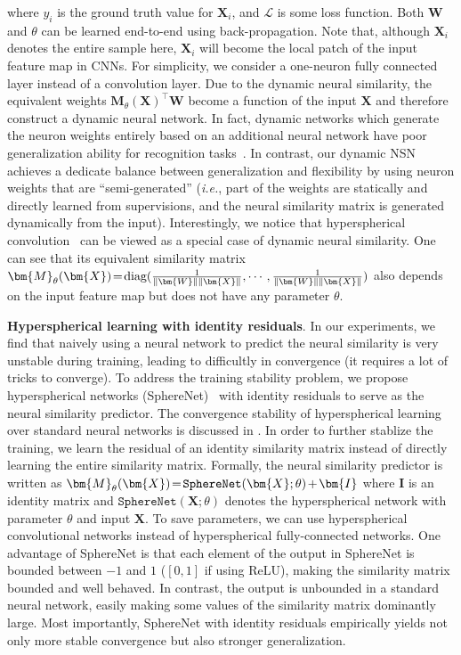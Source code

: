 where $y_i$ is the ground truth value for $\bm{X}_i$, and $\mathcal{L}$ is some loss function. Both $\bm{W}$ and $\theta$ can be learned end-to-end using back-propagation. Note that, although $\bm{X}_i$ denotes the entire sample here, $\bm{X}_i$ will become the local patch of the input feature map in CNNs. For simplicity, we consider a one-neuron fully connected layer instead of a convolution layer.  Due to the dynamic neural similarity, the equivalent weights $\bm{M}_\theta(\bm{X})^\top \bm{W}$ become a function of the input $\bm{X}$ and therefore construct a dynamic neural network. In fact, dynamic networks which generate the neuron weights entirely based on an additional neural network have poor generalization ability for recognition tasks~\cite{ha2016hypernetworks}. In contrast, our dynamic NSN achieves a dedicate balance between generalization and flexibility by using neuron weights that are ``semi-generated'' (\emph{i.e.}, part of the weights are statically and directly learned from supervisions, and the neural similarity matrix is generated dynamically from the input). Interestingly, we notice that hyperspherical convolution~\cite{liu2017hyper} can be viewed as a special case of dynamic neural similarity. One can see that its equivalent similarity matrix $\thickmuskip=2mu \medmuskip=2mu \bm{M}_\theta(\bm{X})=\textnormal{diag}(\frac{1}{\|\bm{W}\|\|\bm{X}\|},\cdots,\frac{1}{\|\bm{W}\|\|\bm{X}\|})$ also depends on the input feature map but does not have any parameter $\theta$.

\par

\textbf{Hyperspherical learning with identity residuals}. In our experiments, we find that naively using a neural network to predict the neural similarity is very unstable during training, leading to difficultly in convergence (it requires a lot of tricks to converge). To address the training stability problem, we propose hyperspherical networks (SphereNet)~\cite{liu2017hyper} with identity residuals to serve as the neural similarity predictor. The convergence stability of hyperspherical learning over standard neural networks is discussed in \cite{liu2017hyper,liu2017sphereface,liu2016large,liu2018decoupled,liu2018learning,LinCoMHE19}. In order to further stablize the training, we learn the residual of an identity similarity matrix instead of directly learning the entire similarity matrix. Formally, the neural similarity predictor is written as $\thickmuskip=2mu \medmuskip=2mu \bm{M}_\theta(\bm{X})=\texttt{SphereNet}(\bm{X};\theta)+\bm{I}$ where $\bm{I}$ is an identity matrix and $\texttt{SphereNet}(\bm{X};\theta)$ denotes the hyperspherical network with parameter $\theta$ and input $\bm{X}$. To save parameters, we can use hyperspherical convolutional networks instead of hyperspherical fully-connected networks. One advantage of SphereNet is that each element of the output in SphereNet is bounded between $-1$ and $1$ ($[0,1]$ if using ReLU), making the similarity matrix bounded and well behaved. In contrast, the output is unbounded in a standard neural network, easily making some values of the similarity matrix dominantly large. Most importantly, SphereNet with identity residuals empirically yields not only more stable convergence but also stronger generalization.

